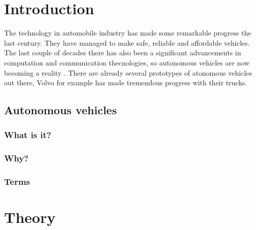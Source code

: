 \documentclass[conference]{IEEEtran}
\begin{document}

\begin{abstract}
\end{abstract}


%
\IEEEpeerreviewmaketitle

\section{Introduction}
The technology in automobile industry has made some remarkable progress the last century. They have managed to 
make safe, reliable and affordable vehicles. The last couple of decades there has also been a significant 
advancements in computation and communication thecnologies, so autonomous vehicles are now becoming a reality \cite{IEEE:AutonomousCars}.
There are already several prototypes of atonomous vehicles out there, Volvo for example has made tremendous progress with
their trucks. 
 \subsection{Autonomous vehicles}
	 \subsubsection{What is it?}
	 \subsubsection{Why?}
	 \subsubsection{Terms}

\section{Theory}
\end{document}
